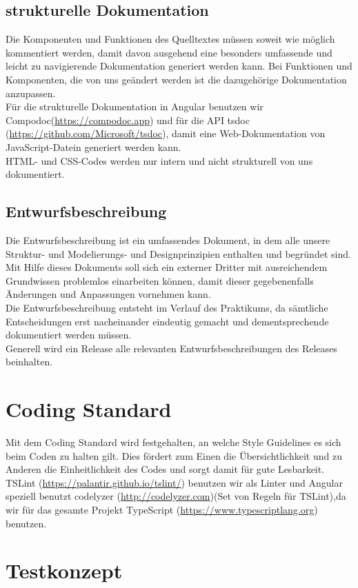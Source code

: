 \documentclass[11pt,a4paper]{report}
\begin{document}
\subsection{strukturelle Dokumentation}
Die Komponenten und Funktionen des Quelltextes müssen soweit wie möglich kommentiert werden, damit davon ausgehend eine besonders umfassende und leicht zu navigierende Dokumentation generiert werden kann.
Bei Funktionen und Komponenten, die von uns geändert werden ist die dazugehörige Dokumentation anzupassen. \\
Für die strukturelle Dokumentation in Angular benutzen wir Compodoc(\url{https://compodoc.app}) und für die API tsdoc (\url{https://github.com/Microsoft/tsdoc}), damit eine Web-Dokumentation von JavaScript-Datein generiert werden kann.\\
HTML- und CSS-Codes werden nur intern und nicht strukturell von uns dokumentiert.
\subsection{Entwurfsbeschreibung}
Die Entwurfsbeschreibung ist ein umfassendes Dokument, in dem alle unsere Struktur- und Modelierungs- und Designprinzipien enthalten und begründet sind. Mit Hilfe dieses Dokuments soll sich ein externer Dritter mit ausreichendem Grundwissen problemlos einarbeiten können, damit dieser gegebenenfalls Änderungen und Anpassungen vornehmen kann.\\
Die Entwurfsbeschreibung entsteht im Verlauf des Praktikums, da sämtliche Entscheidungen erst nacheinander eindeutig gemacht und dementsprechende dokumentiert werden müssen.\\
Generell wird ein Release alle relevanten Entwurfsbeschreibungen des Releases beinhalten.
\section{Coding Standard}
Mit dem Coding Standard wird festgehalten, an welche Style Guidelines es sich beim Coden zu halten gilt. Dies fördert zum Einen die Übersichtlichkeit und zu Anderen die Einheitlichkeit des Codes und sorgt damit für gute Lesbarkeit.\\
TSLint (\url{https://palantir.github.io/tslint/}) benutzen wir als Linter und Angular speziell benutzt codelyzer (\url{http://codelyzer.com})(Set von Regeln für TSLint),da wir für das gesamte Projekt TypeScript (\url{https://www.typescriptlang.org}) benutzen.
\clearpage
\section{Testkonzept}
\end{document}
